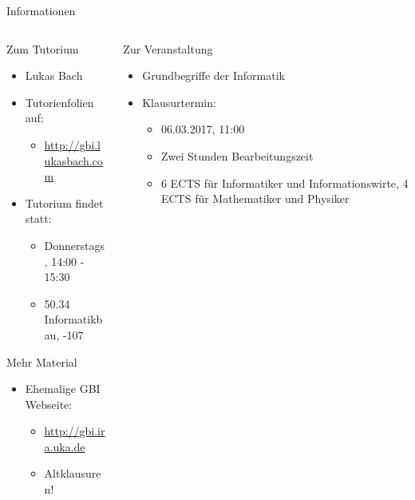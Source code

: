 
{

\begin{frame}{Informationen}
	
	\begin{columns}
		\begin{column}{0.5\textwidth}
			
			\begin{block}{Zum Tutorium}
				\begin{itemize}
					\item Lukas Bach
					\item Tutorienfolien auf: 
					\begin{itemize}
						\item \url{http://gbi.lukasbach.com}
					\end{itemize}
					\item Tutorium findet statt:
					\begin{itemize}
						\item Donnerstags, 14:00 - 15:30
						\item 50.34 Informatikbau, -107
					\end{itemize}
				\end{itemize}
			\end{block}
			
			\begin{block}{Mehr Material}
				\begin{itemize}
					\item Ehemalige GBI Webseite:
					\begin{itemize}
						\item \url{http://gbi.ira.uka.de}
						\item Altklausuren!
					\end{itemize}
				\end{itemize}
			\end{block}
			
		\end{column}
		\begin{column}{0.5\textwidth}
			
			\begin{block}{Zur Veranstaltung}
				\begin{itemize}
					\item Grundbegriffe der Informatik
					\item Klausurtermin:
					\begin{itemize}
						\item 06.03.2017, 11:00
						\item Zwei Stunden Bearbeitungszeit
						\item 6 ECTS für Informatiker und Informationswirte, 4 ECTS für Mathematiker und Physiker
					\end{itemize}
				\end{itemize}
			\end{block}
			

\end{column}
\end{columns}
\end{frame}}
